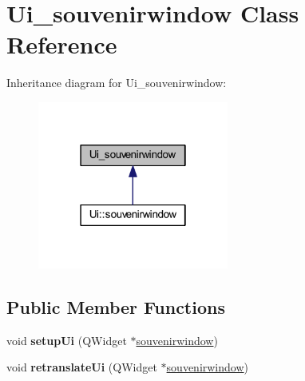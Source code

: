 \hypertarget{class_ui__souvenirwindow}{}\section{Ui\+\_\+souvenirwindow Class Reference}
\label{class_ui__souvenirwindow}


Inheritance diagram for Ui\+\_\+souvenirwindow\+:
\nopagebreak
\begin{figure}[H]
\begin{center}
\leavevmode
\includegraphics[width=178pt]{class_ui__souvenirwindow__inherit__graph}
\end{center}
\end{figure}
\subsection*{Public Member Functions}
\begin{DoxyCompactItemize}
\item 
\mbox{\label{class_ui__souvenirwindow_a591c4c914746cd56085250d3ba4ed075}} 
void {\bfseries setup\+Ui} (Q\+Widget $\ast$\mbox{\hyperlink{classsouvenirwindow}{souvenirwindow}})
\item 
\mbox{\label{class_ui__souvenirwindow_ad8b4d457b100c49ab17f494c619650ea}} 
void {\bfseries retranslate\+Ui} (Q\+Widget $\ast$\mbox{\hyperlink{classsouvenirwindow}{souvenirwindow}})
\end{DoxyCompactItemize}
